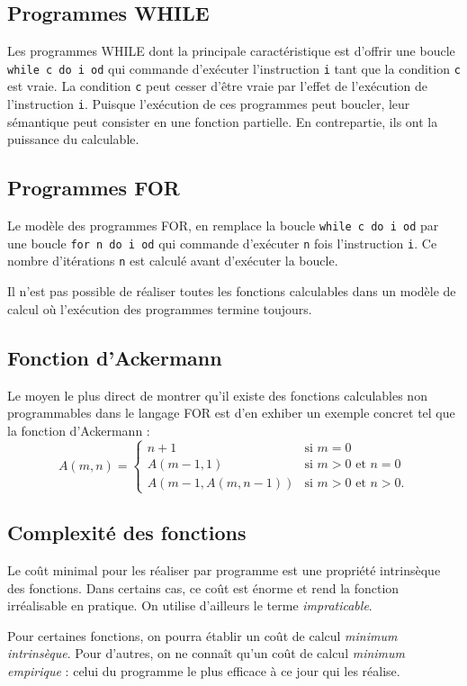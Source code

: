     \subsection{Programmes WHILE}
    Les programmes WHILE dont la principale caractéristique est d'offrir une boucle \texttt{while c do i od} qui commande d'exécuter l'instruction \texttt{i} tant que la condition \texttt{c} est vraie. La condition \texttt{c} peut cesser d'être vraie par l'effet de l'exécution de l'instruction \texttt{i}. Puisque l'exécution de ces programmes peut boucler, leur sémantique peut consister en une fonction partielle. En contrepartie, ils ont la puissance du calculable.

    \subsection{Programmes FOR}
    Le modèle des programmes FOR, en remplace la boucle \texttt{while c do i od} par une boucle \texttt{for n do i od} qui commande d'exécuter \texttt{n} fois l'instruction \texttt{i}. Ce nombre d'itérations \texttt{n} est calculé avant d'exécuter la boucle.
    \begin{result}
        Il n'est pas possible de réaliser toutes les fonctions calculables dans un modèle de calcul où l'exécution des programmes termine toujours.
    \end{result}

    \subsection{Fonction d'Ackermann}
    Le moyen le plus direct de montrer qu'il existe des fonctions calculables non programmables dans le langage FOR est d'en exhiber un exemple concret tel que la fonction d'Ackermann :
    \begin{equation}
        A(m, n) = 
      \begin{cases}
         n+1 & \mbox{si } m = 0 \\
         A(m-1, 1) & \mbox{si } m > 0 \mbox{ et } n = 0 \\
         A(m-1, A(m, n-1)) & \mbox{si } m > 0 \mbox{ et } n > 0.
      \end{cases}
    \end{equation}

    \subsection{Complexité des fonctions}
    \begin{result}
         Le coût minimal pour les réaliser par programme est une propriété intrinsèque des fonctions. Dans certains cas, ce coût est énorme et rend la fonction irréalisable en pratique. On utilise d'ailleurs le terme \emph{impraticable}.
    \end{result}
    Pour certaines fonctions, on pourra établir un coût de calcul \emph{minimum intrinsèque}. Pour d'autres, on ne connaît qu'un coût de calcul \emph{minimum empirique} : celui du programme le plus efficace à ce jour qui les réalise.

